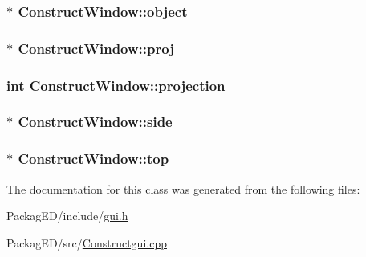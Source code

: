 \subsubsection[{\texorpdfstring{object}{object}}]{$\ast$ Construct\+Window\+::object}\hypertarget{class_construct_window_adc9531aab11327949db243959a44ac10}{}\label{class_construct_window_adc9531aab11327949db243959a44ac10}
\subsubsection[{\texorpdfstring{proj}{proj}}]{$\ast$ Construct\+Window\+::proj}\hypertarget{class_construct_window_a1c4f16b6dbb43569a8aa2c992b13950d}{}\label{class_construct_window_a1c4f16b6dbb43569a8aa2c992b13950d}
\subsubsection[{\texorpdfstring{projection}{projection}}]{\setlength{\rightskip}{0pt plus 5cm}int Construct\+Window\+::projection\hspace{0.3cm}{\ttfamily [private]}}\hypertarget{class_construct_window_a5db9eb781ceacefdfff06d68c30ef108}{}\label{class_construct_window_a5db9eb781ceacefdfff06d68c30ef108}
\subsubsection[{\texorpdfstring{side}{side}}]{ $\ast$ Construct\+Window\+::side\hspace{0.3cm}{\ttfamily [private]}}\hypertarget{class_construct_window_ad2ef07e4940cd866ea8ae64ae1a1b0cb}{}\label{class_construct_window_ad2ef07e4940cd866ea8ae64ae1a1b0cb}
\subsubsection[{\texorpdfstring{top}{top}}]{ $\ast$ Construct\+Window\+::top\hspace{0.3cm}{\ttfamily [private]}}\hypertarget{class_construct_window_a400b924c57cd3a4f09165a5f5862f3cb}{}\label{class_construct_window_a400b924c57cd3a4f09165a5f5862f3cb}


The documentation for this class was generated from the following files\+:\begin{DoxyCompactItemize}
\item 
Packag\+E\+D/include/\hyperlink{gui_8h}{gui.\+h}\item 
Packag\+E\+D/src/\hyperlink{_constructgui_8cpp}{Constructgui.\+cpp}\end{DoxyCompactItemize}
